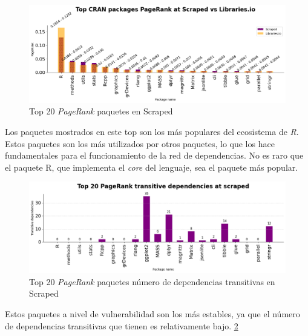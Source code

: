 \begin{figure}[ht!]
    \begin{center}
        \includegraphics[width=1\textwidth]{img/cran/pr_inverted.png}
        \caption{Top 20 \textit{PageRank} paquetes en Scraped}
        \label{fig:Top 20 PageRank paquetes en Scraped}
    \end{center}
\end{figure}

Los paquetes mostrados en este top son los más populares del ecosistema de \textit{R}.
Estos paquetes son los más utilizados por otros paquetes, lo que los hace fundamentales para el
funcionamiento de la red de dependencias. No es raro que el paquete R, que implementa el \textit{core}
del lenguaje, sea el paquete más popular.

\begin{figure}[ht!]
    \begin{center}
        \includegraphics[width=1\textwidth]{img/cran/transitive_pr_scr.png}
        \caption{Top 20 \textit{PageRank} paquetes número de dependencias transitivas en Scraped}
        \label{fig:Top 20 PageRank paquetes número de dependencias transitivas en Scraped}
    \end{center}
\end{figure}

Estos paquetes a nivel de vulnerabilidad son los más estables, ya que el número de dependencias
transitivas que tienen es relativamente bajo. \ref{fig:Top 20 PageRank paquetes número de dependencias transitivas en Scraped}

